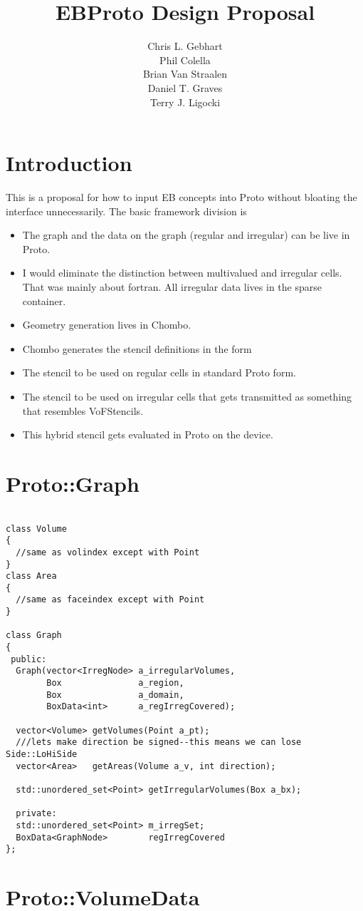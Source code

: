 \documentclass[12pt,a4paper]{article}
\title{EBProto Design Proposal}
\author{Chris L. Gebhart\\Phil Colella \\ Brian Van Straalen\\
  Daniel T. Graves\\Terry J. Ligocki}
\begin{document}
\lstset{language=C++,style=protostyle}
\maketitle

\section{Introduction}
This is a proposal for how to input EB concepts into Proto without
bloating the interface unnecessarily.   The basic framework division
is 
\begin{itemize}
\item The graph and the data on the graph (regular and irregular)
  can be live in Proto.
\item I would eliminate the distinction between multivalued and
  irregular cells.   That was mainly about fortran.   All irregular
  data lives in the sparse container.
\item Geometry generation lives in Chombo.
\item Chombo generates the stencil definitions in the form
  \item The stencil to be used on regular cells in standard Proto form.
  \item The stencil to be used on irregular cells that gets
    transmitted as something that resembles VoFStencils.
\item This hybrid stencil gets evaluated in Proto on the device.
\end{itemize}


\section{Proto::Graph}
\begin{minipage}{\linewidth}
  \begin{lstlisting}[caption=\code{forall} ,label=lst-forall]

class Volume
{
  //same as volindex except with Point
}
class Area
{
  //same as faceindex except with Point
}

class Graph
{
 public:
  Graph(vector<IrregNode> a_irregularVolumes,
        Box               a_region, 
        Box               a_domain,
        BoxData<int>      a_regIrregCovered);

  vector<Volume> getVolumes(Point a_pt);
  ///lets make direction be signed--this means we can lose Side::LoHiSide
  vector<Area>   getAreas(Volume a_v, int direction);

  std::unordered_set<Point> getIrregularVolumes(Box a_bx);

  private:
  std::unordered_set<Point> m_irregSet;
  BoxData<GraphNode>        regIrregCovered
};
  \end{lstlisting}
\end{minipage}

\section{Proto::VolumeData}
\end{document}
